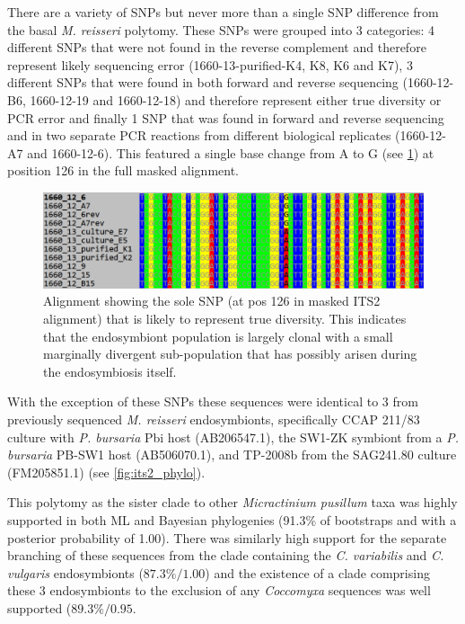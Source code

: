 There are a variety of SNPs but never more than a single SNP difference from the basal \textit{M. reisseri}
polytomy.  These SNPs were grouped into 3 categories: 4 different SNPs that were not found in the
reverse complement and therefore represent likely sequencing error (1660-13-purified-K4, K8, K6 and K7),
3 different SNPs that were found in both forward and reverse sequencing (1660-12-B6, 1660-12-19 and 1660-12-18) and therefore
represent either true diversity or PCR error and finally 1 SNP that was found in 
forward and reverse sequencing and in two separate PCR reactions from different biological replicates (1660-12-A7 and 1660-12-6).
This featured a single base change from A to G (see \cref{fig:its2_snp}) at position 126 in the full masked alignment. 

\begin{figure}
    \includegraphics[width=\textwidth]{its_snp.pdf}
    \caption[ITS2 SNP Alignment]{Alignment showing the sole SNP (at pos 126 in masked ITS2 alignment)
        that is likely to represent true diversity.  This indicates that the endosymbiont
    population is largely clonal with a small marginally divergent sub-population that has possibly
arisen during the endosymbiosis itself.}
    \label{fig:its2_snp}
\end{figure}

With the exception of these SNPs these sequences were identical to 3 from previously sequenced \textit{M. reisseri} endosymbionts, 
specifically CCAP 211/83 culture with \textit{P. bursaria} Pbi host (AB206547.1), the SW1-ZK symbiont from a \textit{P. bursaria} PB-SW1 host (AB506070.1),
and TP-2008b from the SAG241.80 culture (FM205851.1) (see \cref{fig:its2_phylo}).

This polytomy as the sister clade to other \textit{Micractinium pusillum} 
taxa was highly supported in both ML and Bayesian phylogenies (91.3\% of 
bootstraps and with a posterior probability of 1.00).
There was similarly high support for the separate branching of these sequences
from the clade containing the \textit{C. variabilis} and \textit{C. vulgaris} 
endosymbionts (\(87.3\%/1.00\)) and the existence of a clade comprising these 3
endosymbionts to the exclusion of any \textit{Coccomyxa} sequences was well supported
(\(89.3\%/0.95\). 


